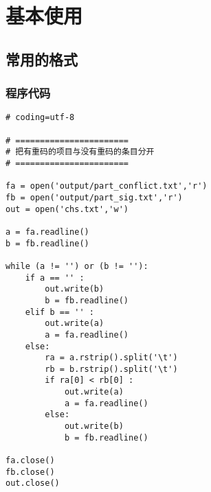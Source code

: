 \chapter{基本使用}

	\section{常用的格式}

		\subsection{程序代码}
 			

\begin{lstlisting}[label=lst:helloworld1, caption=Helloworld2]
# coding=utf-8

# =======================
# 把有重码的项目与没有重码的条目分开
# =======================

fa = open('output/part_conflict.txt','r')
fb = open('output/part_sig.txt','r')
out = open('chs.txt','w')

a = fa.readline()
b = fb.readline()

while (a != '') or (b != ''):
	if a == '' :
		out.write(b)
		b = fb.readline()
	elif b == '' :
		out.write(a)
		a = fa.readline()
	else:
		ra = a.rstrip().split('\t')
		rb = b.rstrip().split('\t')
		if ra[0] < rb[0] :
			out.write(a)
			a = fa.readline()
		else:
			out.write(b)
			b = fb.readline()

fa.close()
fb.close()
out.close()
\end{lstlisting}
